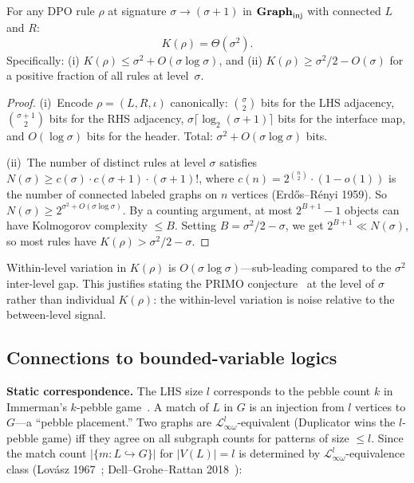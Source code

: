 \documentclass{../shared/primo}
\begin{document}
\begin{proposition}\label{prop:description}
For any DPO rule $\rho$ at signature $\sigma \to (\sigma{+}1)$ in $\mathbf{Graph}_{\mathrm{inj}}$ with connected $L$ and $R$:
\[
K(\rho) = \Theta(\sigma^2).
\]
Specifically: \textup{(i)} $K(\rho) \leq \sigma^2 + O(\sigma \log \sigma)$, and \textup{(ii)} $K(\rho) \geq \sigma^2/2 - O(\sigma)$ for a positive fraction of all rules at level~$\sigma$.
\end{proposition}

\begin{proof}
(i)~Encode $\rho = (L, R, \iota)$ canonically: $\binom{\sigma}{2}$ bits for the LHS adjacency, $\binom{\sigma+1}{2}$ bits for the RHS adjacency, $\sigma \lceil\log_2(\sigma+1)\rceil$ bits for the interface map, and $O(\log \sigma)$ bits for the header. Total: $\sigma^2 + O(\sigma \log \sigma)$ bits.

(ii)~The number of distinct rules at level $\sigma$ satisfies $N(\sigma) \geq c(\sigma) \cdot c(\sigma+1) \cdot (\sigma+1)!$, where $c(n) = 2^{\binom{n}{2}} \cdot (1 - o(1))$ is the number of connected labeled graphs on $n$ vertices (Erd\H{o}s--R\'enyi 1959). So $N(\sigma) \geq 2^{\sigma^2 + O(\sigma \log \sigma)}$. By a counting argument, at most $2^{B+1} - 1$ objects can have Kolmogorov complexity $\leq B$. Setting $B = \sigma^2/2 - \sigma$, we get $2^{B+1} \ll N(\sigma)$, so most rules have $K(\rho) > \sigma^2/2 - \sigma$.
\end{proof}

\begin{remark}
Within-level variation in $K(\rho)$ is $O(\sigma \log \sigma)$---sub-leading compared to the $\sigma^2$ inter-level gap. This justifies stating the PRIMO conjecture~\cite{kowalczyk2026predicates} at the level of $\sigma$ rather than individual $K(\rho)$: the within-level variation is noise relative to the between-level signal.
\end{remark}

\subsection{Connections to bounded-variable logics}
\label{sec:logic}

\textbf{Static correspondence.} The LHS size $l$ corresponds to the pebble count $k$ in Immerman's $k$-pebble game~\cite{immerman1982upper}. A match of $L$ in $G$ is an injection from $l$ vertices to $G$---a ``pebble placement.'' Two graphs are $\mathcal{L}^l_{\infty\omega}$-equivalent (Duplicator wins the $l$-pebble game) iff they agree on all subgraph counts for patterns of size $\leq l$. Since the match count $|\{m : L \hookrightarrow G\}|$ for $|V(L)| = l$ is determined by $\mathcal{L}^l_{\infty\omega}$-equivalence class (Lov\'asz 1967~\cite{lovasz1967operations}; Dell--Grohe--Rattan 2018~\cite{dell2018lovasz}):
\end{document}
